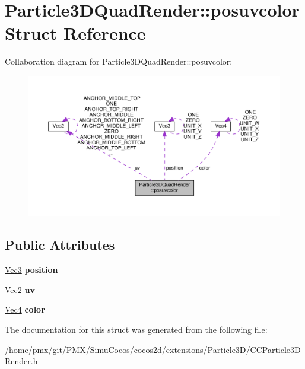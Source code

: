 \hypertarget{structParticle3DQuadRender_1_1posuvcolor}{}\section{Particle3\+D\+Quad\+Render\+:\+:posuvcolor Struct Reference}
\label{structParticle3DQuadRender_1_1posuvcolor}


Collaboration diagram for Particle3\+D\+Quad\+Render\+:\+:posuvcolor\+:
\nopagebreak
\begin{figure}[H]
\begin{center}
\leavevmode
\includegraphics[width=350pt]{structParticle3DQuadRender_1_1posuvcolor__coll__graph}
\end{center}
\end{figure}
\subsection*{Public Attributes}
\begin{DoxyCompactItemize}
\item 
\mbox{\label{structParticle3DQuadRender_1_1posuvcolor_a6350a4ed78134d3ce74dce942521ad4d}} 
\hyperlink{classVec3}{Vec3} {\bfseries position}
\item 
\mbox{\label{structParticle3DQuadRender_1_1posuvcolor_aedd64889295c38c9b58cd03ecd9079c5}} 
\hyperlink{classVec2}{Vec2} {\bfseries uv}
\item 
\mbox{\label{structParticle3DQuadRender_1_1posuvcolor_a42f059b0a194e4e3ee9bc670d6585218}} 
\hyperlink{classVec4}{Vec4} {\bfseries color}
\end{DoxyCompactItemize}


The documentation for this struct was generated from the following file\+:\begin{DoxyCompactItemize}
\item 
/home/pmx/git/\+P\+M\+X/\+Simu\+Cocos/cocos2d/extensions/\+Particle3\+D/C\+C\+Particle3\+D\+Render.\+h\end{DoxyCompactItemize}
